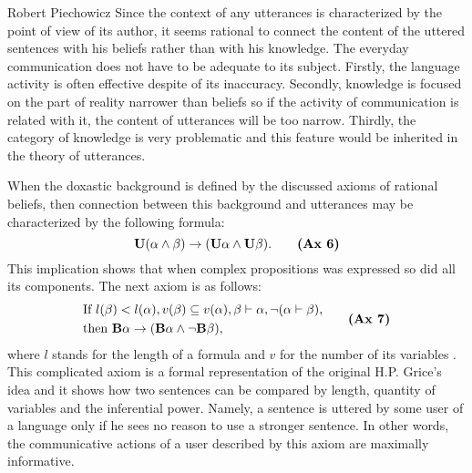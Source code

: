 \begin{artengenv}{Robert Piechowicz}
Since the context of any utterances is characterized by the point of view of its author, it seems rational to connect the content of the uttered sentences with his beliefs rather than with his knowledge. The everyday communication does not have to be adequate to its subject. Firstly, the  language activity is often effective despite of its inaccuracy. Secondly, knowledge is focused on the part of reality narrower than beliefs so if the activity of communication is related with it, the content of utterances will be too narrow. Thirdly, the category of knowledge is very problematic and this feature would be inherited in the theory of utterances.

When the doxastic background is defined by the discussed axioms of rational beliefs, then connection between this background and utterances may be characterized by the following formula:
\begin{equation}
\mathbf{U}(\alpha\wedge \beta)\rightarrow (\mathbf{U}\alpha\wedge \mathbf{U}\beta).\tag*{\textbf{(Ax 6)}}
\end{equation}
This implication shows that when complex propositions was expressed so did all its components. The next axiom is as follows:
\begin{equation}
\begin{split}
&\textrm{If} \  l(\beta)<l(\alpha), v(\beta)\subseteq v(\alpha), \beta\vdash \alpha, \neg(\alpha\vdash \beta),\\
&\textrm{then}\  \mathbf{B}\alpha\rightarrow
(\mathbf{B}\alpha\wedge\neg \mathbf{B}\beta),
\end{split}\tag*{\textbf{(Ax 7)}}
\end{equation}
where $l$ stands for the length of a formula and $v$ for the number of its variables
\parencite[p.152]{tokarz_elementy_1993}.
This complicated axiom is a formal representation of the original H.P. Grice’s idea and it shows how two sentences can be compared by length, quantity of variables and the inferential power. Namely, a sentence is uttered by some user of a language only if he sees no reason to use a stronger sentence. In other words, the communicative actions of a user described by this axiom are maximally informative.


\end{artengenv}
